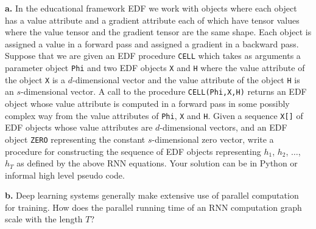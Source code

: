 \documentclass{article}
\newcommand{\solution}[1]{}
\begin{document}
{\bf a.} In the educational framework EDF we work with objects where each object has a value attribute and a gradient attribute each of which have tensor values
where the value tensor and the gradient tensor are the same shape. 
Each object is assigned a value in a forward pass and assigned a gradient in a backward pass.
Suppose that we are given an EDF procedure {\tt CELL} which takes as
arguments a parameter object {\tt Phi} and two EDF objects {\tt X} and {\tt H} where the value attribute of the object {\tt X} is a $d$-dimensional vector and the value attribute of the object {\tt H} is an $s$-dimensional vector.  A call to the procedure {\tt CELL(Phi,X,H)} returns an EDF object whose value attribute is computed in a forward pass in some possibly complex way
from the value attributes of {\tt Phi}, {\tt X} and {\tt H}. 
Given a sequence {\tt X[]} of EDF objects whose value attributes are $d$-dimensional vectors, and an EDF object {\tt ZERO} representing the constant $s$-dimensional zero vector,
write a procedure for constructing the sequence of EDF objects representing $h_1$, $h_2$, $\ldots$, $h_T$ as defined by the above RNN equations.
Your solution can be in Python or informal high level pseudo code.

\solution{
  We can use the equations given as the definition of the computation graph if we replace $c$ in the equations with the function {\tt CELL}.
  In the folloing code CELL is a class parameter packages and the call CELL() creaates a fresh parameter package on each call.
  A recuarive solution can also be given.
\begin{tabbing}
  X = list() \\
  H = list() \\
  H[0] = CELL(Phi(),X[0],ZERO) \\
  for \=t in range(1,T) \\
  \>H[t] = CELL(Phi,X[t],H[t-1])
\end{tabbing}
}

{\bf b.} Deep learning systems generally make extensive use of parallel computation for training.
How does the parallel running time of an RNN computation graph scale with the length $T$?

\solution{
  The parallel running time is proportional to $T$. RNNS are fundamentally serial and this is a problem.  RNNs have recently been largely replaced by the transformer architecture.}
    
\end{document}
